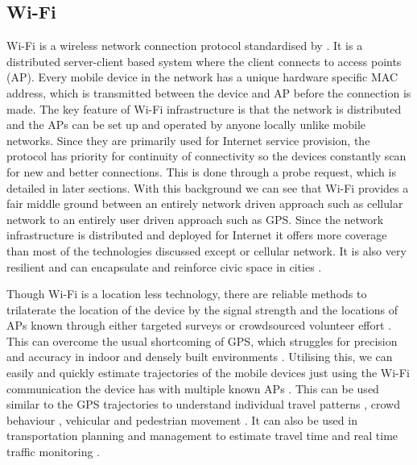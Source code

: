 \subsection{Wi-Fi}

Wi-Fi is a wireless network connection protocol standardised by \citet{ieee2016}.
It is a distributed server-client based system where the client connects to access points (AP).
Every mobile device in the network has a unique hardware specific MAC address, which is transmitted between the device and AP before the connection is made.
The key feature of Wi-Fi infrastructure is that the network is distributed and the APs can be set up and operated by anyone locally unlike mobile networks.
Since they are primarily used for Internet service provision, the protocol has priority for continuity of connectivity so the devices constantly scan for new and better connections.
This is done through a probe request, which is detailed in later sections.
With this background we can see that Wi-Fi provides a fair middle ground between an entirely network driven approach such as cellular network to an entirely user driven approach such as GPS.
Since the network infrastructure is distributed and deployed for Internet it offers more coverage than most of the technologies discussed except or cellular network. It is also very resilient and can encapsulate and reinforce civic space in cities \cite{torrens2008}.

Though Wi-Fi is a location less technology, there are reliable methods to trilaterate the location of the device by the signal strength and the locations of APs known through either targeted surveys or crowdsourced volunteer effort \citep{he2003, moore2004, lamarca2005, dinesh2017, lin2018}.
This can overcome the usual shortcoming of GPS, which struggles for precision and accuracy in indoor and densely built environments \citep{zarim2006, kawaguchi2009, xi2010}.
Utilising this, we can easily and quickly estimate trajectories of the mobile devices just using the Wi-Fi communication the device has with multiple known APs \cite{xu2013}.
This can be used similar to the GPS trajectories to understand individual travel patterns \citep{kim2006, rekimoto2007, sap2015}, crowd behaviour \citep{abedi2013, mowafi2013, shu2017}, vehicular \citep{lu2010} and pedestrian movement \citep{xu2013, fukuzaki2014, wang2016, taylor2019}.
It can also be used in transportation planning and management to estimate travel time \citep{musa2011, haakegaard2018} and real time traffic monitoring \citep{abbott-jard2013}.

